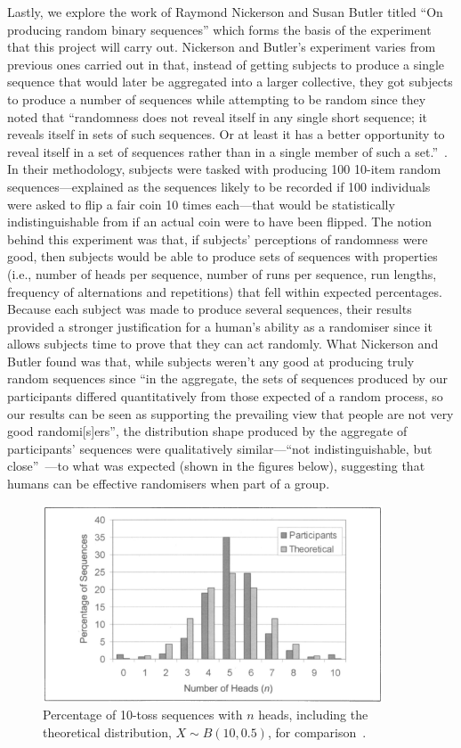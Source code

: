 Lastly, we explore the work of Raymond Nickerson and Susan Butler titled ``On producing random binary sequences'' which forms the basis of the experiment that this project will carry out. Nickerson and Butler's experiment varies from previous ones carried out in that, instead of getting subjects to produce a single sequence that would later be aggregated into a larger collective, they got subjects to produce a number of sequences while attempting to be random since they noted that ``randomness does not reveal itself in any single short sequence; it reveals itself in sets of such sequences. Or at least it has a better opportunity to reveal itself in a set of sequences rather than in a single member of such a set.''~\cite{nickerson:2009}. In their methodology, subjects were tasked with producing 100 10-item random sequences—explained as the sequences likely to be recorded if 100 individuals were asked to flip a fair coin 10 times each—that would be statistically indistinguishable from if an actual coin were to have been flipped. The notion behind this experiment was that, if subjects' perceptions of randomness were good, then subjects would be able to produce sets of sequences with properties (i.e., number of heads per sequence, number of runs per sequence, run lengths, frequency of alternations and repetitions) that fell within expected percentages. Because each subject was made to produce several sequences, their results provided a stronger justification for a human's ability as a randomiser since it allows subjects time to prove that they can act randomly. What Nickerson and Butler found was that, while subjects weren't any good at producing truly random sequences since ``in the aggregate, the sets of sequences produced by our participants differed quantitatively from those expected of a random process, so our results can be seen as supporting the prevailing view that people are not very good randomi[s]ers'', the distribution shape produced by the aggregate of participants' sequences were qualitatively similar—``not indistinguishable, but close''~\cite{nickerson:2009}—to what was expected (shown in the figures below), suggesting that humans can be effective randomisers when part of a group.
\begin{figure}
\centering
    \includegraphics[width=0.9\textwidth]{images/nickerson_2009_number_of_heads.png}
    \caption{Percentage of 10-toss sequences with $n$ heads, including the theoretical distribution, $X \sim B(10, 0.5)$, for comparison~\cite{nickerson:2009}.}
\end{figure}

